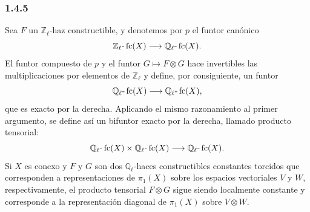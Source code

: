 \subsubsection*{1.4.5}
Sea \(F\) un \(\mathbb Z_\ell\)-haz constructible, y denotemos por \(p\) el funtor canónico
\[
\mathbb Z_\ell\text{-}\operatorname{fc}(X)\longrightarrow \mathbb Q_\ell\text{-}\operatorname{fc}(X).
\]
El funtor compuesto de \(p\) y el funtor \(G\mapsto F\otimes G\) hace invertibles las multiplicaciones por elementos de \(\mathbb Z_\ell\) y define, por consiguiente, un funtor
\[
\mathbb Q_\ell\text{-}\operatorname{fc}(X)\longrightarrow \mathbb Q_\ell\text{-}\operatorname{fc}(X),
\]
que es exacto por la derecha. Aplicando el mismo razonamiento al primer argumento, se define así un bifuntor exacto por la derecha, llamado producto tensorial:
\[
\mathbb Q_\ell\text{-}\operatorname{fc}(X)\times \mathbb Q_\ell\text{-}\operatorname{fc}(X)
\longrightarrow \mathbb Q_\ell\text{-}\operatorname{fc}(X).
\]
Si \(X\) es conexo y \(F\) y \(G\) son dos \(\mathbb Q_\ell\)-haces constructibles constantes torcidos que corresponden a representaciones de \(\pi_1(X)\) sobre los espacios vectoriales \(V\) y \(W\), respectivamente, el producto tensorial \(F\otimes G\) sigue siendo localmente constante y corresponde a la representación diagonal de \(\pi_1(X)\) sobre \(V\otimes W\).

